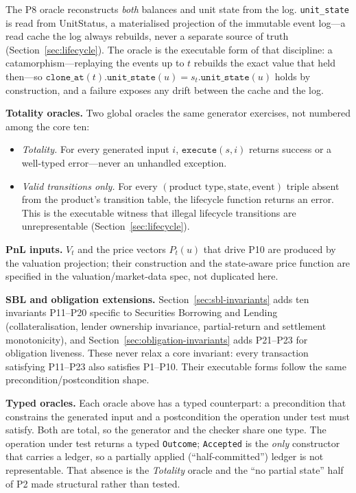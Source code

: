 \begin{remark}
The P8 oracle reconstructs \emph{both} balances and unit state from the log. \texttt{unit\_state} is read from UnitStatus, a materialised projection of the immutable event log---a read cache the log always rebuilds, never a separate source of truth (Section~\ref{sec:lifecycle}). The oracle is the executable form of that discipline: a catamorphism---replaying the events up to $t$ rebuilds the exact value that held then---so $\texttt{clone\_at}(t).\texttt{unit\_state}(u)=s_t.\texttt{unit\_state}(u)$ holds by construction, and a failure exposes any drift between the cache and the log.
\end{remark}

\noindent\textbf{Totality oracles.} Two global oracles the same generator exercises, not numbered among the core ten:
\begin{itemize}
\item \emph{Totality.} For every generated input $i$, $\texttt{execute}(s,i)$ returns success or a well-typed error---never an unhandled exception.
\item \emph{Valid transitions only.} For every $(\text{product type},\text{state},\text{event})$ triple absent from the product's transition table, the lifecycle function returns an error. This is the executable witness that illegal lifecycle transitions are unrepresentable (Section~\ref{sec:lifecycle}).
\end{itemize}

\noindent\textbf{PnL inputs.} $V_t$ and the price vectors $P_t(u)$ that drive P10 are produced by the valuation projection; their construction and the state-aware price function are specified in the valuation/market-data spec, not duplicated here.

\noindent\textbf{SBL and obligation extensions.} Section~\ref{sec:sbl-invariants} adds ten invariants P11--P20 specific to Securities Borrowing and Lending (collateralisation, lender ownership invariance, partial-return and settlement monotonicity), and Section~\ref{sec:obligation-invariants} adds P21--P23 for obligation liveness. These never relax a core invariant: every transaction satisfying P11--P23 also satisfies P1--P10. Their executable forms follow the same precondition/postcondition shape.

\medskip
\noindent\textbf{Typed oracles.} Each oracle above has a typed counterpart: a precondition that constrains the generated input and a postcondition the operation under test must satisfy. Both are total, so the generator and the checker share one type. The operation under test returns a typed \texttt{Outcome}; \texttt{Accepted} is the \emph{only} constructor that carries a ledger, so a partially applied (``half-committed'') ledger is not representable. That absence is the \emph{Totality} oracle and the ``no partial state'' half of P2 made structural rather than tested.

